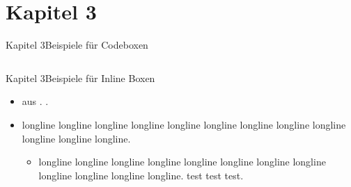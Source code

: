 
\if{}\section{Kapitel 3}\fi

\begin{frame}[fragile, label={kapitel3}]{Kapitel 3}{Beispiele für Codeboxen}
  \begin{columns}
    \begin{column}{0.4\textwidth}
    \end{column}
    \hfill
    \begin{column}{0.4\textwidth}
      \begin{linenums}
      \end{linenums}
    \end{column}
  \end{columns}
\end{frame}

\begin{frame}[fragile]{Kapitel 3}{Beispiele für Inline Boxen}
  \begin{itemize}
      \item {} aus .
      \aitem {}.
      \item longline longline longline longline longline longline longline longline longline longline longline longline.
      \begin{itemize}
        \item longline longline longline longline longline longline longline longline longline longline longline longline.
        \grayitem \textcolor{gray!90!black}{test test test.}
      \end{itemize}
    \end{itemize}
\end{frame}


